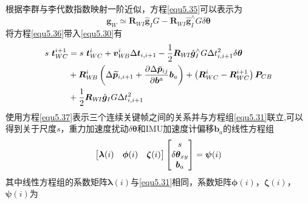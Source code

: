根据李群与李代数指数映射一阶近似，方程\eqref{equ5.35}可以表示为
\begin{equation}
\label{equ5.36}
\boldsymbol{g}_W \simeq \boldsymbol{R}_{W\!I} \hat{\boldsymbol{g}}_I G - \boldsymbol{R}_{W\!I} \hat{\boldsymbol{g}}_I^{\wedge}G\delta \boldsymbol{\theta} 
\end{equation}
将方程\eqref{equ5.36}带入\eqref{equ5.30}有
\begin{equation}
\label{equ5.37}
\begin{aligned}
s \ \boldsymbol{t}_{WC}^{i+1} &= s \ \boldsymbol{t}_{WC}^i +  \boldsymbol{v}_{W\!B}^i \Delta \boldsymbol{t}_{i,i+1} 
- { 1 \over 2} \boldsymbol{R}_{W\!I} \hat{\boldsymbol{g}}_I^{\wedge}G \Delta t_{i,i+1}^2  \delta \boldsymbol{\theta} 
\\
& + \boldsymbol{R}_{W\!B}^i \left( \Delta \widetilde{\boldsymbol{p}}_{i,i+1} + {\partial \Delta \bar{\boldsymbol{p}}_{ij} \over \partial \boldsymbol{b}^a } \boldsymbol{b}_a  \right) +\left( \boldsymbol{R}_{WC}^i - \boldsymbol{R}_{WC}^{i+1} \right) \boldsymbol{P}_{CB} 
\\
& + {1 \over 2} \boldsymbol{R}_{W\!I} \hat{\boldsymbol{g}}_I G \Delta t_{i,i+1}^2
\end{aligned}
\end{equation}
使用方程\eqref{equ5.37}表示三个连续关键帧之间的关系并与方程组\eqref{equ5.31}联立,可以得到关于尺度$s$，重力加速度扰动$\delta \boldsymbol{\theta}$和IMU加速度计偏移$\boldsymbol{b}_a$的线性方程组
\begin{equation}
\label{equ5.38}
\begin{bmatrix}
\boldsymbol{\lambda} (i) & \boldsymbol{\phi} (i) & \boldsymbol{\zeta}  (i) \cr
\end{bmatrix}
\begin{bmatrix}
s \cr \delta \boldsymbol{\theta}_{xy} \cr \boldsymbol{b}_a \cr
\end{bmatrix}
= \boldsymbol{\psi} (i)
\end{equation}
其中线性方程组的系数矩阵$\boldsymbol{\lambda} (i)$与\eqref{equ5.31}相同，系数矩阵$\boldsymbol{\phi}(i)$，$\boldsymbol{\zeta}(i)$，$\boldsymbol{\psi}(i)$为
